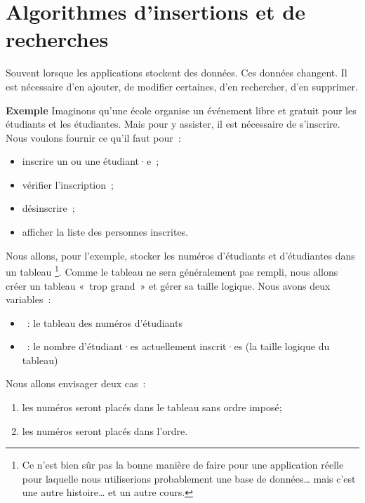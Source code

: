 \chapter{Algorithmes d'insertions et de recherches}

	Souvent lorsque les applications stockent des données. Ces données changent. 
	Il est nécessaire d'en ajouter, de modifier certaines, d'en rechercher, d'en
	supprimer. 

	\minitoc
	\clearpage

	\textbf{Exemple}	Imaginons qu'une école organise un événement libre et
	gratuit pour les étudiants et les étudiantes.  Mais pour y assister, il est
	nécessaire de s’inscrire. Nous voulons fournir ce qu’il faut pour~:
	
	\begin{itemize}
	\item inscrire un ou une étudiant·e~;
	\item vérifier l'inscription~;
	\item désinscrire~;
	\item afficher la liste des personnes inscrites.
	\end{itemize}

	Nous allons, pour l'exemple, stocker les numéros d'étudiants et d'étudiantes
	dans un tableau%
	\footnote{%
		Ce n'est bien sûr pas la bonne manière de faire pour une application 
		réelle pour laquelle nous utiliserions probablement une base de données…
		mais c'est une autre histoire… et un autre cours. 
	}.
	Comme le tableau ne sera généralement pas rempli, nous allons créer un
	tableau «~trop grand~» et gérer sa taille logique.  Nous avons deux
	variables~:
	
	\begin{itemize}
	\item {}~: le tableau des numéros d’étudiants
	\item {}~: le nombre d’étudiant·es actuellement inscrit·es 
		(la taille logique du tableau)
	\end{itemize}
	
	Nous allons envisager deux cas~:
	\begin{enumerate}
	\item les numéros seront placés dans le tableau sans ordre imposé;
	\item les numéros seront placés dans l’ordre.		
	\end{enumerate}
	
